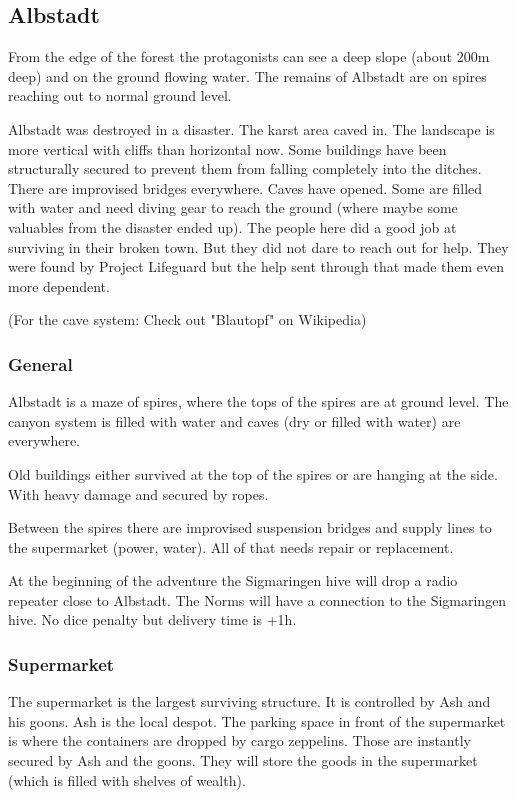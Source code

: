 \subsection{Albstadt}

From the edge of the forest the protagonists can see a deep slope (about 200m deep) and on the ground flowing water. The remains of Albstadt are on spires reaching out to normal ground level.

Albstadt was destroyed in a disaster. The karst area caved in. The landscape is more vertical with cliffs than horizontal now. Some buildings have been structurally secured to prevent them from falling completely into the ditches. There are improvised bridges everywhere. Caves have opened. Some are filled with water and need diving gear to reach the ground (where maybe some valuables from the disaster ended up).
The people here did a good job at surviving in their broken town. But they did not dare to reach out for help. They were found by Project Lifeguard but the help sent through that made them even more dependent.

(For the cave system: Check out "Blautopf" on Wikipedia)

\subsubsection{General}

Albstadt is a maze of spires, where the tops of the spires are at ground level. The canyon system is filled with water and caves (dry or filled with water) are everywhere.

Old buildings either survived at the top of the spires or are hanging at the side. With heavy damage and secured by ropes.

Between the spires there are improvised suspension bridges and supply lines to the supermarket (power, water). All of that needs repair or replacement.

At the beginning of the adventure the Sigmaringen hive will drop a radio repeater close to Albstadt. The Norms will have a connection to the Sigmaringen hive. No dice penalty but delivery time is +1h.

\subsubsection{Supermarket}

The supermarket is the largest surviving structure. It is controlled by Ash and his goons. Ash is the local despot. The parking space in front of the supermarket is where the containers are dropped by cargo zeppelins. Those are instantly secured by Ash and the goons.
They will store the goods in the supermarket (which is filled with shelves of wealth).


